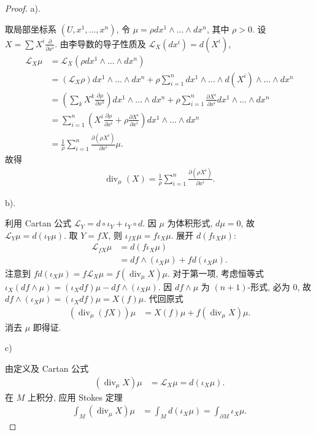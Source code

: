 \documentclass[../main.tex]{subfiles}
\begin{document}
\begin{proof}
 a).

取局部坐标系 $(U, x^1, \dots, x^n)$, 令 $\mu = \rho dx^1 \wedge \dots \wedge dx^n$, 其中 $\rho > 0$. 设 $X = \sum X^i \frac{\partial}{\partial x^i}$.
由李导数的导子性质及 $\mathcal{L}_X(dx^i) = d(X^i)$,
$$
\begin{aligned}
\mathcal{L}_X \mu &= \mathcal{L}_X(\rho dx^1 \wedge \dots \wedge dx^n) \\
&= (\mathcal{L}_X \rho) dx^1 \wedge \dots \wedge dx^n + \rho \sum_{i=1}^n dx^1 \wedge \dots \wedge d(X^i) \wedge \dots \wedge dx^n \\
&= \left( \sum_{k} X^k \frac{\partial \rho}{\partial x^k} \right) dx^1 \wedge \dots \wedge dx^n + \rho \sum_{i=1}^n \frac{\partial X^i}{\partial x^i} dx^1 \wedge \dots \wedge dx^n \\
&= \sum_{i=1}^n \left( X^i \frac{\partial \rho}{\partial x^i} + \rho \frac{\partial X^i}{\partial x^i} \right) dx^1 \wedge \dots \wedge dx^n \\
&= \frac{1}{\rho} \sum_{i=1}^n \frac{\partial (\rho X^i)}{\partial x^i} \mu.
\end{aligned}
$$
故得
$$
\begin{aligned}
\operatorname{div}_\mu(X) = \frac{1}{\rho} \sum_{i=1}^n \frac{\partial (\rho X^i)}{\partial x^i}.
\end{aligned}
$$

b).

利用 Cartan 公式 $\mathcal{L}_Y = d \circ \iota_Y + \iota_Y \circ d$. 因 $\mu$ 为体积形式, $d\mu=0$, 故 $\mathcal{L}_Y \mu = d(\iota_Y \mu)$.
取 $Y=fX$, 则 $\iota_{fX}\mu = f\iota_X\mu$.
展开 $d(f\iota_X\mu)$:
$$
\begin{aligned}
\mathcal{L}_{fX} \mu &= d(f \iota_X \mu) \\
&= df \wedge (\iota_X \mu) + f d(\iota_X \mu).
\end{aligned}
$$
注意到 $f d(\iota_X \mu) = f \mathcal{L}_X \mu = f (\operatorname{div}_\mu X) \mu$.
对于第一项, 考虑恒等式 $\iota_X(df \wedge \mu) = (\iota_X df)\mu - df \wedge (\iota_X \mu)$.
因 $df \wedge \mu$ 为 $(n+1)$-形式, 必为 $0$, 故 $df \wedge (\iota_X \mu) = (\iota_X df)\mu = X(f)\mu$.
代回原式
$$
\begin{aligned}
(\operatorname{div}_\mu(fX)) \mu &= X(f)\mu + f(\operatorname{div}_\mu X)\mu.
\end{aligned}
$$
消去 $\mu$ 即得证.

 c)

由定义及 Cartan 公式
$$
\begin{aligned}
(\operatorname{div}_\mu X)\mu &= \mathcal{L}_X \mu = d(\iota_X \mu).
\end{aligned}
$$
在 $M$ 上积分, 应用 Stokes 定理
$$
\begin{aligned}
\int_M (\operatorname{div}_\mu X)\mu &= \int_M d(\iota_X \mu) = \int_{\partial M} \iota_X \mu.
\end{aligned}
$$


\end{proof}
\end{document}
